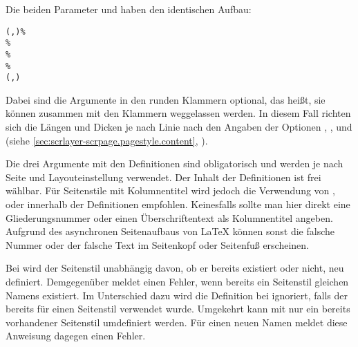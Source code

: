 Die beiden Parameter  und  haben
den identischen Aufbau:
\begin{flushleft}
\begin{addmargin}{1em}\raggedright\small
  \texttt{(,)\%\\
    \%\\
    \%\\
    \%\\
    (,)%
  }
\end{addmargin}
\end{flushleft}
Dabei sind die Argumente in den runden Klammern optional, das heißt, sie
können zusammen mit den Klammern weggelassen
werden. In diesem Fall richten sich die
Längen und Dicken je nach Linie nach den Angaben der Optionen
,
,
 und
 (siehe
\autoref{sec:scrlayer-scrpage.pagestyle.content},
).

Die drei Argumente mit den Definitionen sind obligatorisch und werden je nach
Seite und Layouteinstellung verwendet. Der Inhalt der Definitionen ist frei
wählbar. Für Seitenstile mit Kolumnentitel wird jedoch die Verwendung von
,
 oder
 innerhalb der Definitionen
empfohlen. Keinesfalls sollte man hier direkt eine
Gliederungsnummer oder einen Überschriftentext als Kolumnentitel
angeben. Aufgrund des asynchronen Seitenaufbaus von \LaTeX{} können sonst die
falsche Nummer oder der falsche Text im Seitenkopf oder Seitenfuß erscheinen.

Bei  wird der Seitenstil unabhängig
davon, ob er bereits existiert oder nicht, neu definiert. Demgegenüber meldet
 einen Fehler, wenn bereits ein Seitenstil gleichen Namens
existiert. Im Unterschied dazu wird die Definition bei
 ignoriert, falls der  bereits für einen
Seitenstil verwendet wurde. Umgekehrt kann mit  nur ein
bereits vorhandener Seitenstil umdefiniert werden. Für einen neuen Namen
meldet diese Anweisung dagegen einen Fehler.

